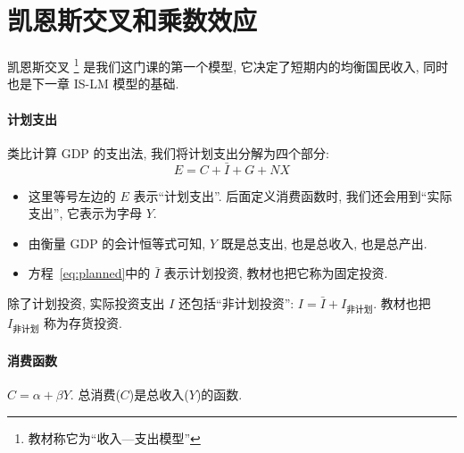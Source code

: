 
\section*{凯恩斯交叉和乘数效应}

凯恩斯交叉%
  \footnote{教材称它为``收入—支出模型''}
是我们这门课的第一个模型, 它决定了短期内的均衡国民收入, 
同时也是下一章 IS-LM 模型的基础.


\paragraph{计划支出}
类比计算 GDP 的支出法, 我们将计划支出分解为四个部分: 
\begin{equation}
E = C + \bar{I} + G + NX 
\label{eq:planned}  
\end{equation}
\begin{itemize}
\item
  这里等号左边的 $E$ 表示``计划支出''. 后面定义消费函数时, 我们还会用到``实际支出'', 它表示为字母 $Y$. 
\item
  由衡量 GDP 的会计恒等式可知, $Y$ 既是总支出, 也是总收入, 也是总产出.
\item
  方程~\eqref{eq:planned}中的 $\bar{I}$ 表示计划投资, 教材也把它称为固定投资. 
\end{itemize}

除了计划投资, 实际投资支出 $I$ 还包括``非计划投资'': $I = \bar{I} + I_{\text{非计划}}$.
教材也把 $I_{\text{非计划}}$ 称为存货投资. 


\paragraph{消费函数} $C = \alpha + \beta  Y$. 总消费($C$)是总收入($Y$)的函数.  

